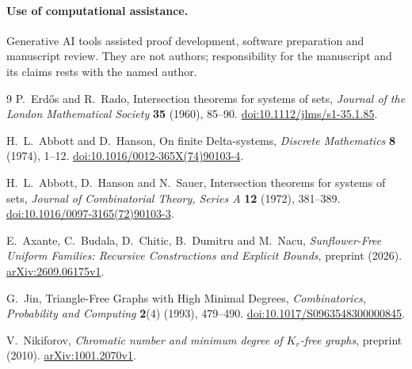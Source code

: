 \documentclass[11pt,a4paper]{article}
\numberwithin{equation}{section}
\theoremstyle{remark}
\begin{document}
\paragraph{Use of computational assistance.}
Generative AI tools assisted proof development, software preparation and
manuscript review. They are not authors; responsibility for the manuscript
and its claims rests with the named author.

\begin{thebibliography}{9}
P.~Erd\H{o}s and R.~Rado,
Intersection theorems for systems of sets,
\emph{Journal of the London Mathematical Society} \textbf{35} (1960), 85--90.
\href{https://doi.org/10.1112/jlms/s1-35.1.85}{doi:10.1112/jlms/s1-35.1.85}.

H.~L.~Abbott and D.~Hanson,
On finite Delta-systems,
\emph{Discrete Mathematics} \textbf{8} (1974), 1--12.
\href{https://doi.org/10.1016/0012-365X(74)90103-4}{doi:10.1016/0012-365X(74)90103-4}.

H.~L.~Abbott, D.~Hanson and N.~Sauer,
Intersection theorems for systems of sets,
\emph{Journal of Combinatorial Theory, Series A} \textbf{12} (1972), 381--389.
\href{https://doi.org/10.1016/0097-3165(72)90103-3}{doi:10.1016/0097-3165(72)90103-3}.

E.~Axante, C.~Budala, D.~Chitic, B.~Dumitru and M.~Nacu,
\emph{Sunflower-Free Uniform Families: Recursive Constructions and Explicit Bounds},
preprint (2026).
\href{https://arxiv.org/abs/2609.06175v1}{arXiv:2609.06175v1}.

G.~Jin,
Triangle-Free Graphs with High Minimal Degrees,
\emph{Combinatorics, Probability and Computing} \textbf{2}(4) (1993), 479--490.
\href{https://doi.org/10.1017/S0963548300000845}{doi:10.1017/S0963548300000845}.

V.~Nikiforov,
\emph{Chromatic number and minimum degree of \(K_r\)-free graphs},
preprint (2010).
\href{https://arxiv.org/abs/1001.2070v1}{arXiv:1001.2070v1}.

\end{thebibliography}
\end{document}
